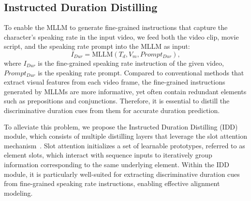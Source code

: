 \subsection{Instructed Duration Distilling}
To enable the MLLM to generate fine-grained instructions that capture the character’s speaking rate in the input video, we feed both the video clip, movie script, and the speaking rate prompt into the MLLM as input:
\begin{equation}
     I_{Dur} = \mathrm{MLLM}(T_d,V_{m},Prompt_{Dur}),
\end{equation}
where $I_{Dur}$ is the fine-grained speaking rate instruction of the given video, $Prompt_{Dur}$ is the speaking rate prompt.
Compared to conventional methods that extract visual features from each video frame, the fine-grained instructions generated by MLLMs are more informative, yet often contain redundant elements such as prepositions and conjunctions.
Therefore, it is essential to distill the discriminative duration cues from them for accurate duration prediction.

To alleviate this problem, we propose the Instructed Duration Distilling (IDD) module, which consists of multiple distilling layers that leverage the slot attention mechanism~\cite{slotattention}.
Slot attention initializes a set of learnable prototypes, referred to as element slots, which interact with sequence inputs to iteratively group information corresponding to the same underlying element. 
Within the IDD module, it is particularly well-suited for extracting discriminative duration cues from fine-grained speaking rate instructions, enabling effective alignment modeling.

